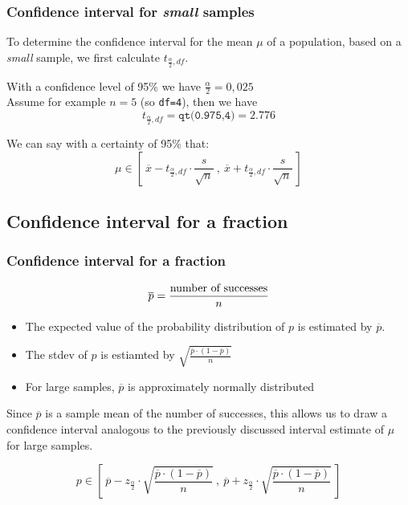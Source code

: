 \documentclass{beamer}
\begin{document}
\begin{frame}
\frametitle{Confidence interval for \textit{small} samples}
To determine the confidence interval for the mean $\mu$ of a population, based on a \textit{small} sample, we first calculate $t_ {\frac{\alpha}{2},df}$.

\vfill
With a confidence level of 95\% we have $\frac{\alpha}{2}=0,025$\\
Assume for example $n=5$ (so \texttt{df=4}), then we have
\[ t_ {\frac{\alpha}{2},df} = \texttt{qt(0.975,4)} = 2.776 \]

\vfill
We can say with a certainty of 95\% that:
\[ \mu \in \left[~ \overline{x} - t_{\frac{\alpha}{2},df} \cdot \frac{s}{\sqrt{n}} ~,~ \overline{x} + t_{\frac{\alpha}{2},df} \cdot \frac{s}{\sqrt{n}} ~\right] \]

\end{frame}

\subsection{Confidence interval for a fraction}

\begin{frame}
  \frametitle{Confidence interval for a fraction}
  \[ \overline{p} = \frac{\textnormal{number of successes}}{n} \]
  \begin{itemize}
  \item The expected value of the probability distribution of $p$ is estimated by $\overline{p}$.
  \item The stdev of $p$ is estiamted by $\sqrt{\frac{\overline{p} \cdot (1-\overline{p})}{n}}$
  \item For large samples, $\overline{p}$ is approximately normally distributed
\end{itemize}

Since $\overline{p}$ is a sample mean of the number of successes, this allows us to draw a confidence interval analogous to the previously discussed interval estimate of $\mu$ for large samples.

  \[ p \in \left[~ \overline{p} - z_{\frac{\alpha}{2}} \cdot \sqrt{\frac{\overline{p} \cdot (1-\overline{p})}{n}} ~,~ \overline{p} + z_{\frac{\alpha}{2}} \cdot \sqrt{\frac{\overline{p} \cdot (1-\overline{p})}{n}} ~\right] \]
\end{frame}
\end{document}
